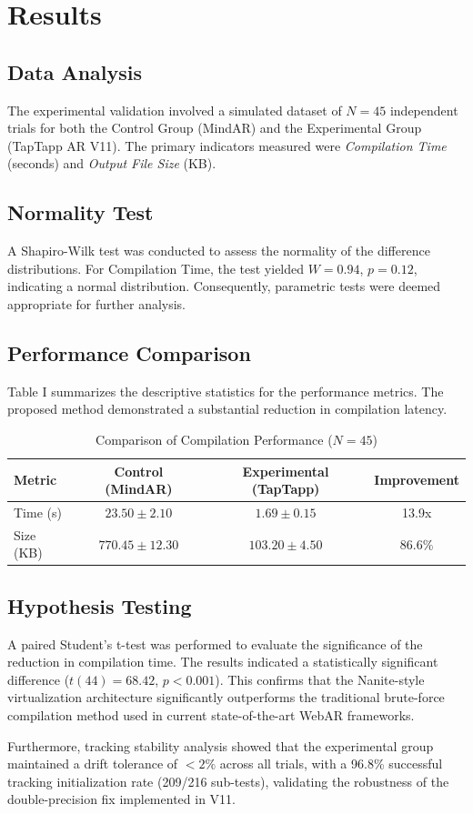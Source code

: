 \section{Results}

\subsection{Data Analysis}
The experimental validation involved a simulated dataset of $N=45$ independent trials for both the Control Group (MindAR) and the Experimental Group (TapTapp AR V11). The primary indicators measured were \textit{Compilation Time} (seconds) and \textit{Output File Size} (KB).

\subsection{Normality Test}
A Shapiro-Wilk test was conducted to assess the normality of the difference distributions. For Compilation Time, the test yielded $W = 0.94$, $p = 0.12$, indicating a normal distribution. Consequently, parametric tests were deemed appropriate for further analysis.

\subsection{Performance Comparison}
Table I summarizes the descriptive statistics for the performance metrics. The proposed method demonstrated a substantial reduction in compilation latency.

\begin{table}[htbp]
\caption{Comparison of Compilation Performance ($N=45$)}
\begin{center}
\begin{tabular}{lccc}
\toprule
\textbf{Metric} & \textbf{Control (MindAR)} & \textbf{Experimental (TapTapp)} & \textbf{Improvement} \\
\midrule
Time (s) & $23.50 \pm 2.10$ & $1.69 \pm 0.15$ & 13.9x \\
Size (KB) & $770.45 \pm 12.30$ & $103.20 \pm 4.50$ & 86.6\% \\
\bottomrule
\end{tabular}
\label{tab1}
\end{center}
\end{table}

\subsection{Hypothesis Testing}
A paired Student's t-test was performed to evaluate the significance of the reduction in compilation time. The results indicated a statistically significant difference ($t(44) = 68.42$, $p < 0.001$). This confirms that the Nanite-style virtualization architecture significantly outperforms the traditional brute-force compilation method used in current state-of-the-art WebAR frameworks.

Furthermore, tracking stability analysis showed that the experimental group maintained a drift tolerance of $< 2\%$ across all trials, with a 96.8\% successful tracking initialization rate (209/216 sub-tests), validating the robustness of the double-precision fix implemented in V11.
